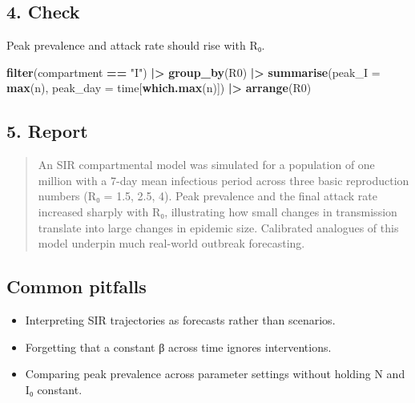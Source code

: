 \documentclass[
]{article}
\newenvironment{Shaded}{\begin{snugshade}}{\end{snugshade}}
\newcommand{\AttributeTok}[1]{\textcolor[rgb]{0.13,0.29,0.53}{#1}}
\newcommand{\FunctionTok}[1]{\textcolor[rgb]{0.13,0.29,0.53}{\textbf{#1}}}
\newcommand{\NormalTok}[1]{#1}
\newcommand{\SpecialCharTok}[1]{\textcolor[rgb]{0.81,0.36,0.00}{\textbf{#1}}}
\newcommand{\StringTok}[1]{\textcolor[rgb]{0.31,0.60,0.02}{#1}}
\providecommand{\tightlist}{%
  \setlength{\itemsep}{0pt}\setlength{\parskip}{0pt}}
\begin{document}
\subsection{4. Check}\label{check}

Peak prevalence and attack rate should rise with R₀.

\begin{Shaded}
\begin{Highlighting}[]
  \FunctionTok{filter}\NormalTok{(compartment }\SpecialCharTok{==} \StringTok{"I"}\NormalTok{) }\SpecialCharTok{|\textgreater{}}
  \FunctionTok{group\_by}\NormalTok{(R0) }\SpecialCharTok{|\textgreater{}}
  \FunctionTok{summarise}\NormalTok{(}\AttributeTok{peak\_I =} \FunctionTok{max}\NormalTok{(n), }\AttributeTok{peak\_day =}\NormalTok{ time[}\FunctionTok{which.max}\NormalTok{(n)]) }\SpecialCharTok{|\textgreater{}}
  \FunctionTok{arrange}\NormalTok{(R0)}
\end{Highlighting}
\end{Shaded}

\subsection{5. Report}\label{report}

\begin{quote}
An SIR compartmental model was simulated for a population of one million
with a 7-day mean infectious period across three basic reproduction
numbers (R₀ = 1.5, 2.5, 4). Peak prevalence and the final attack rate
increased sharply with R₀, illustrating how small changes in
transmission translate into large changes in epidemic size. Calibrated
analogues of this model underpin much real-world outbreak forecasting.
\end{quote}

\subsection{Common pitfalls}\label{common-pitfalls}

\begin{itemize}
\tightlist
\item
  Interpreting SIR trajectories as forecasts rather than scenarios.
\item
  Forgetting that a constant β across time ignores interventions.
\item
  Comparing peak prevalence across parameter settings without holding N
  and I₀ constant.
\end{itemize}
\end{document}

